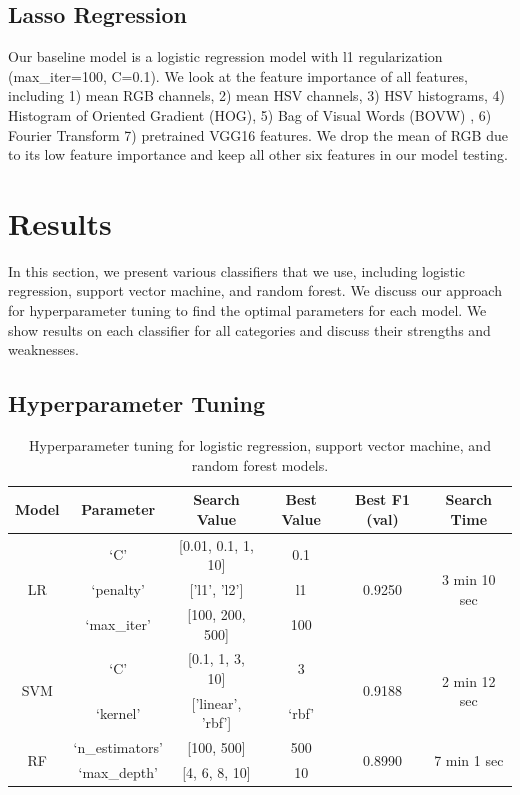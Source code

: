 \documentclass[11pt]{article}
\begin{document}
\subsection{Lasso Regression}
Our baseline model is a logistic regression model with l1 regularization (max\_iter=100, C=0.1). We look at the feature importance of all features, including 1) mean RGB channels, 2) mean HSV channels, 3) HSV histograms, 4) Histogram of Oriented Gradient (HOG), 5) Bag of Visual Words (BOVW) , 6) Fourier Transform 7) pretrained VGG16 features. We drop the mean of RGB due to its low feature importance and keep all other six features in our model testing.

\section{Results}
In this section, we present various classifiers that we use, including logistic regression, support vector machine, and random forest. We discuss our approach for hyperparameter tuning to find the optimal parameters for each model. We show results on each classifier for all categories and discuss their strengths and weaknesses. 

\subsection{Hyperparameter Tuning}

\begin{table}[h!]
\centering
\begin{tabular}{|c|c|c|c|c|c|}
\hline
\textbf{Model} & \textbf{Parameter} & \textbf{Search Value} & \textbf{Best Value} & \textbf{Best F1 (val)} & \textbf{Search Time} \\
\hline
\multirow{3}{*}{LR} & ‘C’ & [0.01, 0.1, 1, 10] & 0.1 & \multirow{3}{*}{0.9250} & \multirow{3}{*}{3 min 10 sec} \\
\cline{2-4}
 & ‘penalty’ & ['l1', 'l2'] & l1 & & \\
\cline{2-4}
 & ‘max\_iter’ & [100, 200, 500] & 100 & & \\
\hline
\multirow{2}{*}{SVM} & ‘C’ & [0.1, 1, 3, 10] & 3 & \multirow{2}{*}{0.9188} & \multirow{2}{*}{2 min 12 sec} \\
\cline{2-4}
 & ‘kernel’ & ['linear', 'rbf'] & ‘rbf’ & & \\
\hline
\multirow{2}{*}{RF} & ‘n\_estimators’ & [100, 500] & 500 & \multirow{2}{*}{0.8990} & \multirow{2}{*}{7 min 1 sec} \\
\cline{2-4}
 & ‘max\_depth’ & [4, 6, 8, 10] & 10 & & \\
\hline
\end{tabular}
\caption{Hyperparameter tuning for logistic regression, support vector machine, and random forest models.}
\label{table:hyperparam}
\end{table}
\end{document}
